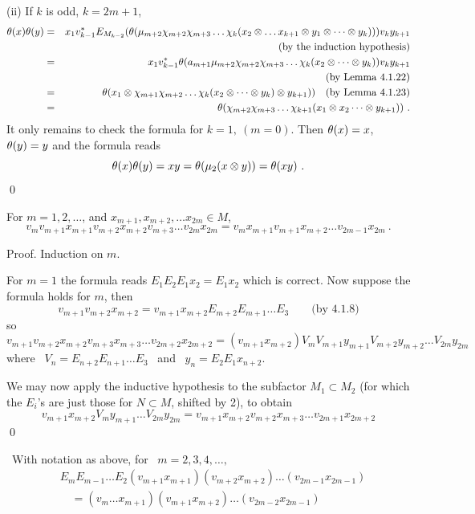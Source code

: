 (ii) If $k$ is odd, $k=2m+1$,
\begin{eqnarray*}
\theta(x)\theta(y) & = & x_1 v^*_{k-1} E_{M_{k-2}} (\theta(\mu_{m+2}\chi_{m+2}\chi_{m+3}\dots\chi_k (x_2\otimes\dots x_{k+1}\otimes y_1 \otimes\dots\otimes y_k)))v_ky_{k+1} \\
& & \mbox{(by the induction hypothesis)} \\
& = & x_1v^*_{k-1}\theta(a_{m+1}\mu_{m+2}\chi_{m+2}\chi_{m+3}\dots \chi_k(x_2\otimes\dots\otimes y_k))v_ky_{k+1}\\
& & \mbox{(by Lemma 4.1.22)}\\
& = & \theta(x_1\otimes \chi_{m+1}\chi_{m+2}\dots \chi_k(x_2\otimes\dots\otimes y_k)\otimes y_{k+1})) \quad \mbox{(by Lemma 4.1.23)}\\
& = &\theta(\chi_{m+2}\chi_{m+3}\dots \chi_{k+1}(x_1\otimes x_2 \dots\otimes y_{k+1})) \ .
\end{eqnarray*}
It only remains to check the formula for $k\!=\!1, \ (m\!=\!0)$.
Then $\theta(x)=x$, \ $\theta(y)=y$ and the formula reads
\[
\th(x)\th(y)=xy=\th(\mu_2(x\otimes y))=\th(xy) \ .
\]
\qed

\bs
{}
For $m=1,2,\dots$, and $x_{m+1},x_{m+2},\dots x_{2m}\in M$,
$$
v_mv_{m+1}x_{m+1}v_{m+2}x_{m+2}v_{m+3}\dots
v_{2m}x_{2m}=v_mx_{m+1}v_{m+1}x_{m+2}\dots v_{2m-1}x_{2m} \  .
$$

\bigskip
{\sc Proof.} Induction on $m$.

For $m=1$ the formula reads $E_1E_2E_1x_2=E_1x_2$ which is correct.
Now suppose the formula holds for $m$, then
$$
v_{m+1}v_{m+2}x_{m+2} =v_{m+1}x_{m+2}E_{m+2}E_{m+1}\dots E_3 \qquad
\mbox{(by 4.1.8)}
$$
so
$$
v_{m+1}v_{m+2}x_{m+2} v_{m+3}x_{m+3}\dots v_{2m+2}x_{2m+2} =
(v_{m+1}x_{m+2}) V_mV_{m+1} y_{m+1}V_{m+2}y_{m+2}\dots
V_{2m}y_{2m}
$$
where \  $V_n=E_{n+2}E_{n+1}\dots E_3$ \ and \
$y_n=E_2E_1x_{n+2}$.

We may now apply the inductive hypothesis to the subfactor
$M_1\subset M_2$ (for which the $E_i$'s are just those for
$N\subset M$, shifted by 2), to obtain
$$
v_{m+1}x_{m+2}V_my_{m+1}\dots V_{2m}y_{2m}=
v_{m+1}x_{m+2}v_{m+2}x_{m+3}\dots v_{2m+1}x_{2m+2}
$$
\qed

\bs
{} \ With notation as above, for \
$m=2,3,4,\dots,$
\begin{eqnarray*}
& E_mE_{m-1}\dots E_2(v_{m+1}x_{m+1})(v_{m+2}x_{m+2})\dots
(v_{2m-1}x_{2m-1}) \\
&\quad =
(v_m\dots x_{m+1})(v_{m+1}x_{m+2})\dots (v_{2m-2}x_{2m-1})
\end{eqnarray*}

